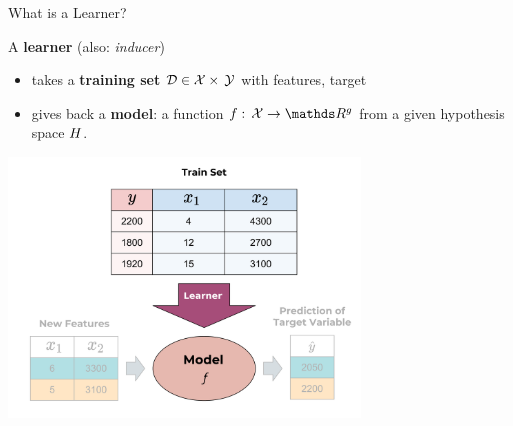 \documentclass[11pt,compress,t,notes=noshow, xcolor=table]{beamer}
\begin{document}
\begin{frame}{What is a Learner?}

A \textbf{learner} (also: \emph{inducer}) 
\begin{itemize}
\item takes a \textbf{training set} $\mathcal{D} \in \mathcal{X} \times\, \mathcal{Y}$ with features, target
\item gives back  a \textbf{model}: a function $f:\, \Xspace \to \R^g$ from a given hypothesis space $H$.\\
\end{itemize}


\vspace{-0.5cm}

\scriptsize

\begin{center}\includegraphics[width=0.7\textwidth]{figure_man/the_inducer_web} \end{center}

\normalsize

\end{frame}

\endlecture
\end{document}
